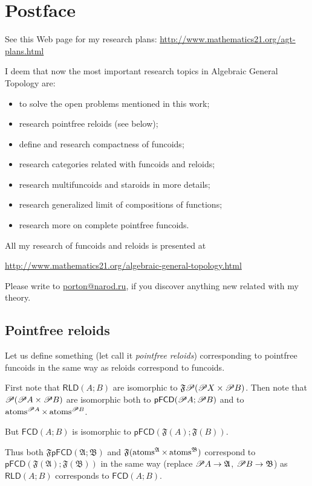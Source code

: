 
\chapter{Postface}

See this Web page for my research plans: \href{http://www.mathematics21.org/agt-plans.html}{http://www.mathematics21.org/agt-plans.html}

I deem that now the most important research topics in Algebraic General
Topology are:
\begin{itemize}
\item to solve the open problems mentioned in this work;
\item research pointfree reloids (see below);
\item define and research compactness of funcoids;
\item research categories related with funcoids and reloids;
\item research multifuncoids and staroids in more details;
\item research generalized limit of compositions of functions;
\item research more on complete pointfree funcoids.
\end{itemize}
All my research of funcoids and reloids is presented at

\href{http://www.mathematics21.org/algebraic-general-topology.html}{http://www.mathematics21.org/algebraic-general-topology.html}

Please write to \href{mailto:porton@narod.ru}{porton@narod.ru}, if
you discover anything new related with my theory.


\section{Pointfree reloids}

Let us define something (let call it \emph{pointfree reloids}) corresponding
to pointfree funcoids in the same way as reloids correspond to funcoids.

First note that $\mathsf{RLD}(A;B)$ are isomorphic to $\mathfrak{F}\mathscr{P}(\mathscr{P} X\times\mathscr{P} B)$.
Then note that $\mathscr{P}(\mathscr{P} A\times\mathscr{P} B)$ are isomorphic
both to $\mathsf{pFCD}(\mathscr{P} A;\mathscr{P} B)$ and to $\operatorname{atoms}^{\mathscr{P} A}\times\operatorname{atoms}^{\mathscr{P} B}$.

But $\mathsf{FCD}(A;B)$ is isomorphic to $\mathsf{pFCD}(\mathfrak{F}(A);\mathfrak{F}(B))$.

Thus both $\mathfrak{F}\mathsf{pFCD}(\mathfrak{A};\mathfrak{B})$
and $\mathfrak{F}(\operatorname{atoms}^{\mathfrak{A}}\times\operatorname{atoms}^{\mathfrak{B}})$
correspond to $\mathsf{pFCD}(\mathfrak{F}(\mathfrak{A});\mathfrak{F}(\mathfrak{B}))$
in the same way (replace $\mathscr{P} A\rightarrow\mathfrak{A}$, $\mathscr{P} B\rightarrow\mathfrak{B}$)
as $\mathsf{RLD}(A;B)$ corresponds to $\mathsf{FCD}(A;B)$.

